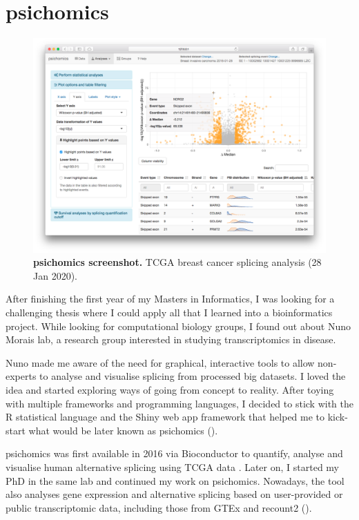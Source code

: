 \chapter{psichomics}

\begin{figure}[!b]
  \vspace*{-.5cm}
  \includegraphics[width=.93\textwidth]{images/psichomics/screenshot}
  \centering
  \vspace*{-.5cm}
  \caption[psichomics screenshot]{\textbf{psichomics screenshot.} TCGA breast cancer splicing analysis (28 Jan 2020).}
  \label{fig:psichomics-screenshot}
\end{figure}

After finishing the first year of my Masters in Informatics, I was looking for a challenging thesis where I could apply all that I learned into a bioinformatics project. While looking for computational biology groups, I found out about Nuno Morais lab, a research group interested in studying transcriptomics in disease.

Nuno made me aware of the need for graphical, interactive tools to allow non-experts to analyse and visualise splicing from processed big datasets. I loved the idea and started exploring ways of going from concept to reality. After toying with multiple frameworks and programming languages, I decided to stick with the R statistical language and the Shiny web app framework \cite{chang:2021ul} that helped me to kick-start what would be later known as psichomics ().

psichomics was first available in 2016 via Bioconductor to quantify, analyse and visualise human alternative splicing using TCGA data \cite{chang:2013ww}. Later on, I started my PhD in the same lab and continued my work on psichomics. Nowadays, the tool also analyses gene expression and alternative splicing based on user-provided or public transcriptomic data, including those from GTEx \cite{lonsdale:2013uo} and recount2 \cite{collado-torres:2017uw} ().

